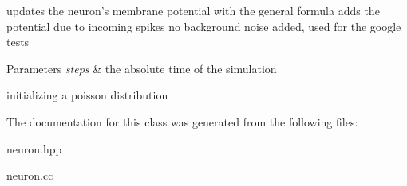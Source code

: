 updates the neuron's membrane potential with the general formula adds the potential due to incoming spikes no background noise added, used for the google tests 


\begin{DoxyParams}{Parameters}
{\em steps} & the absolute time of the simulation \\
\hline
\end{DoxyParams}
initializing a poisson distribution 

The documentation for this class was generated from the following files\-:\begin{DoxyCompactItemize}
\item 
neuron.\-hpp\item 
neuron.\-cc\end{DoxyCompactItemize}

